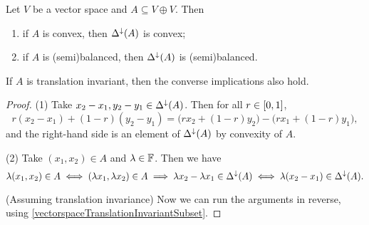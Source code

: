 \begin{lemma}
Let $V$ be a vector space and $A\subseteq V\oplus V$. Then
\begin{enumerate}
\item if $A$ is convex, then $\Delta^{\downarrow}(A)$ is convex;
\item if $A$ is (semi)balanced, then $\Delta^\downarrow(A)$ is (semi)balanced.
\end{enumerate}
If $A$ is translation invariant, then the converse implications also hold.
\end{lemma}
\begin{proof}
(1) Take $x_2-x_1, y_2-y_1\in \Delta^{\downarrow}(A)$. Then for all $r\in\interval{0,1}$,
\[ r(x_2-x_1) + (1-r)(y_2- y_1) = \big(rx_2 + (1-r)y_2\big) - \big(rx_1 + (1-r)y_1\big), \]
and the right-hand side is an element of $\Delta^{\downarrow}(A)$ by convexity of $A$.

(2) Take $(x_1,x_2)\in A$ and $\lambda\in\mathbb{F}$. Then we have
\[ \lambda(x_1,x_2)\in A \iff (\lambda x_1, \lambda x_2)\in A \implies \lambda x_2 - \lambda x_1\in \Delta^\downarrow(A) \iff \lambda(x_2 - x_1)\in \Delta^\downarrow(A). \]

(Assuming translation invariance) Now we can run the arguments in reverse, using \ref{vectorspaceTranslationInvariantSubset}.
\end{proof}

